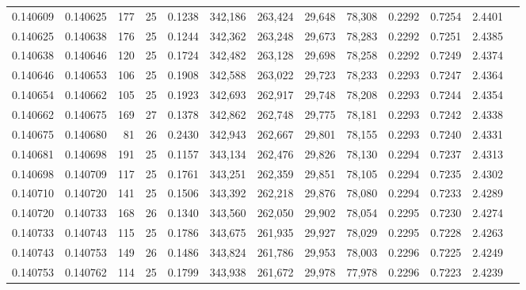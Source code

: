 \begin{tabular}{rrrrrrrrrrrrr}
0.140609 & 0.140625 &   177 &  25 &                                     0.1238 & 342,186 & 263,424 &  29,648 &  78,308 & 0.2292 & 0.7254 & 2.4401 \\
0.140625 & 0.140638 &   176 &  25 &                                     0.1244 & 342,362 & 263,248 &  29,673 &  78,283 & 0.2292 & 0.7251 & 2.4385 \\
0.140638 & 0.140646 &   120 &  25 &                                     0.1724 & 342,482 & 263,128 &  29,698 &  78,258 & 0.2292 & 0.7249 & 2.4374 \\
0.140646 & 0.140653 &   106 &  25 &                                     0.1908 & 342,588 & 263,022 &  29,723 &  78,233 & 0.2293 & 0.7247 & 2.4364 \\
0.140654 & 0.140662 &   105 &  25 &                                     0.1923 & 342,693 & 262,917 &  29,748 &  78,208 & 0.2293 & 0.7244 & 2.4354 \\
0.140662 & 0.140675 &   169 &  27 &                                     0.1378 & 342,862 & 262,748 &  29,775 &  78,181 & 0.2293 & 0.7242 & 2.4338 \\
0.140675 & 0.140680 &    81 &  26 &                                     0.2430 & 342,943 & 262,667 &  29,801 &  78,155 & 0.2293 & 0.7240 & 2.4331 \\
0.140681 & 0.140698 &   191 &  25 &                                     0.1157 & 343,134 & 262,476 &  29,826 &  78,130 & 0.2294 & 0.7237 & 2.4313 \\
0.140698 & 0.140709 &   117 &  25 &                                     0.1761 & 343,251 & 262,359 &  29,851 &  78,105 & 0.2294 & 0.7235 & 2.4302 \\
0.140710 & 0.140720 &   141 &  25 &                                     0.1506 & 343,392 & 262,218 &  29,876 &  78,080 & 0.2294 & 0.7233 & 2.4289 \\
0.140720 & 0.140733 &   168 &  26 &                                     0.1340 & 343,560 & 262,050 &  29,902 &  78,054 & 0.2295 & 0.7230 & 2.4274 \\
0.140733 & 0.140743 &   115 &  25 &                                     0.1786 & 343,675 & 261,935 &  29,927 &  78,029 & 0.2295 & 0.7228 & 2.4263 \\
0.140743 & 0.140753 &   149 &  26 &                                     0.1486 & 343,824 & 261,786 &  29,953 &  78,003 & 0.2296 & 0.7225 & 2.4249 \\
0.140753 & 0.140762 &   114 &  25 &                                     0.1799 & 343,938 & 261,672 &  29,978 &  77,978 & 0.2296 & 0.7223 & 2.4239 \\

\end{tabular}
